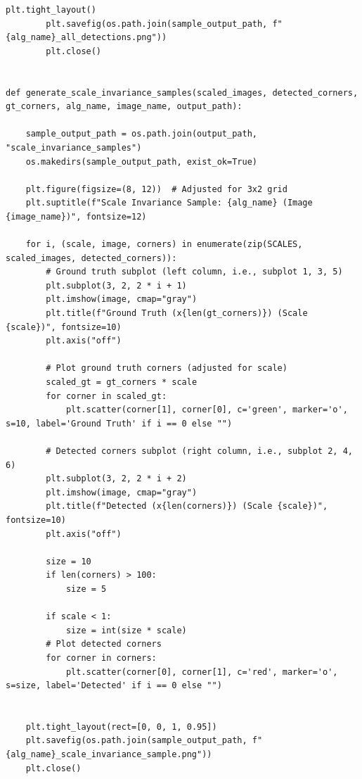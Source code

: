 \documentclass[journal]{IEEEtran}
\begin{document}
\begin{lstlisting}[style=python, caption={Utility Functions for Data Processing}, label={lst:utilities}]
        plt.tight_layout()
        plt.savefig(os.path.join(sample_output_path, f"{alg_name}_all_detections.png"))
        plt.close()
        
        
def generate_scale_invariance_samples(scaled_images, detected_corners, gt_corners, alg_name, image_name, output_path):
    
    sample_output_path = os.path.join(output_path, "scale_invariance_samples")
    os.makedirs(sample_output_path, exist_ok=True)
    
    plt.figure(figsize=(8, 12))  # Adjusted for 3x2 grid
    plt.suptitle(f"Scale Invariance Sample: {alg_name} (Image {image_name})", fontsize=12)
    
    for i, (scale, image, corners) in enumerate(zip(SCALES, scaled_images, detected_corners)):
        # Ground truth subplot (left column, i.e., subplot 1, 3, 5)
        plt.subplot(3, 2, 2 * i + 1)
        plt.imshow(image, cmap="gray")
        plt.title(f"Ground Truth (x{len(gt_corners)}) (Scale {scale})", fontsize=10)
        plt.axis("off")
        
        # Plot ground truth corners (adjusted for scale)
        scaled_gt = gt_corners * scale
        for corner in scaled_gt:
            plt.scatter(corner[1], corner[0], c='green', marker='o', s=10, label='Ground Truth' if i == 0 else "")
        
        # Detected corners subplot (right column, i.e., subplot 2, 4, 6)
        plt.subplot(3, 2, 2 * i + 2)
        plt.imshow(image, cmap="gray")
        plt.title(f"Detected (x{len(corners)}) (Scale {scale})", fontsize=10)
        plt.axis("off")
        
        size = 10
        if len(corners) > 100:
            size = 5
        
        if scale < 1:
            size = int(size * scale)
        # Plot detected corners
        for corner in corners:
            plt.scatter(corner[0], corner[1], c='red', marker='o', s=size, label='Detected' if i == 0 else "")
        
    
    plt.tight_layout(rect=[0, 0, 1, 0.95])
    plt.savefig(os.path.join(sample_output_path, f"{alg_name}_scale_invariance_sample.png"))
    plt.close()
    


\end{lstlisting}
\end{document}

